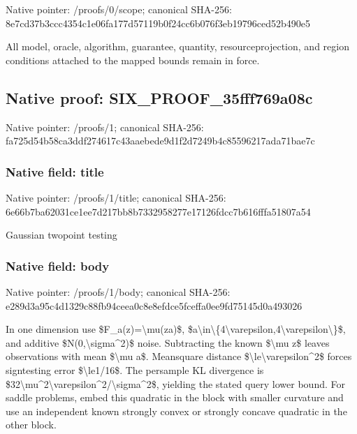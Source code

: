 \documentclass[10pt,a4paper]{article}
\begin{document}
Native pointer: /proofs/0/scope; canonical SHA-256: 8e7cd37b3ccc4354c1e06fa1\allowbreak{}77d57119b0f24cc6b076f3eb\allowbreak{}19796ced52b490e5


All model, oracle, algorithm, guarantee, quantity, resourceprojection, and region conditions attached to the mapped bounds remain in force.


\subsection{Native proof: SIX\_PROOF\_35fff769a08c}


Native pointer: /proofs/1; canonical SHA-256: fa725d54b58ca3ddf274617c\allowbreak{}43aaebede9d1f2d7249b4c85\allowbreak{}596217ada71bae7c



\subsubsection{Native field: title}


Native pointer: /proofs/1/title; canonical SHA-256: 6e66b7ba62031ce1ee7d217b\allowbreak{}b8b7332958277e17126fdcc7\allowbreak{}b616fffa51807a54


Gaussian twopoint testing


\subsubsection{Native field: body}


Native pointer: /proofs/1/body; canonical SHA-256: e289d3a95c4d1329c88fb94c\allowbreak{}eea0c8e8efdce5fceffa0ee9\allowbreak{}fd75145d0a493026


In one dimension use \$F\_a(z)=\textbackslash{}mu(za)\$, \$a\textbackslash{}in\textbackslash{}\{4\textbackslash{}varepsilon,4\textbackslash{}varepsilon\textbackslash{}\}\$, and additive \$N(0,\textbackslash{}sigma\textasciicircum{}2)\$ noise. Subtracting the known \$\textbackslash{}mu z\$ leaves observations with mean \$\textbackslash{}mu a\$. Meansquare distance \$\textbackslash{}le\textbackslash{}varepsilon\textasciicircum{}2\$ forces signtesting error \$\textbackslash{}le1/16\$. The persample KL divergence is \$32\textbackslash{}mu\textasciicircum{}2\textbackslash{}varepsilon\textasciicircum{}2/\textbackslash{}sigma\textasciicircum{}2\$, yielding the stated query lower bound. For saddle problems, embed this quadratic in the block with smaller curvature and use an independent known strongly convex or strongly concave quadratic in the other block.
\end{document}
